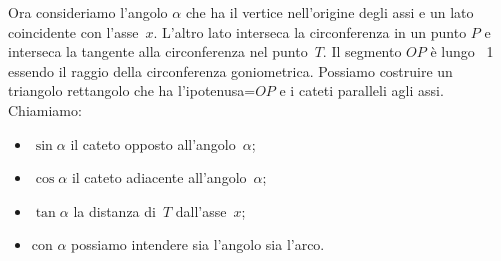 \begin{minipage}{.49\textwidth}
Ora consideriamo l'angolo \(\alpha\) che ha il vertice nell'origine degli 
assi e un lato coincidente con l'asse~\(x\). L'altro lato interseca la 
circonferenza in un punto \(P\) e interseca la tangente alla circonferenza 
nel punto~\(T\).
Il segmento \(OP\) è lungo ~1 essendo il raggio della circonferenza 
goniometrica.
Possiamo costruire un triangolo rettangolo che ha l'ipotenusa=\(OP\) e i 
cateti paralleli agli assi. Chiamiamo:
\begin{itemize} [nosep]
 \item \(\sin \alpha\) il cateto opposto all'angolo~\(\alpha\);
 \item \(\cos \alpha\) il cateto adiacente all'angolo~\(\alpha\);
 \item \(\tan \alpha\) la distanza di~\(T\) dall'asse~\(x\);
 \item con \(\alpha\) possiamo intendere sia l'angolo sia l'arco.
\end{itemize}
\end{minipage}
\begin{minipage}{.49\textwidth}
  \begin{center}
\begin{inaccessibleblock}
    
\end{inaccessibleblock}
  \end{center}
\end{minipage}



\vspace{1em}

